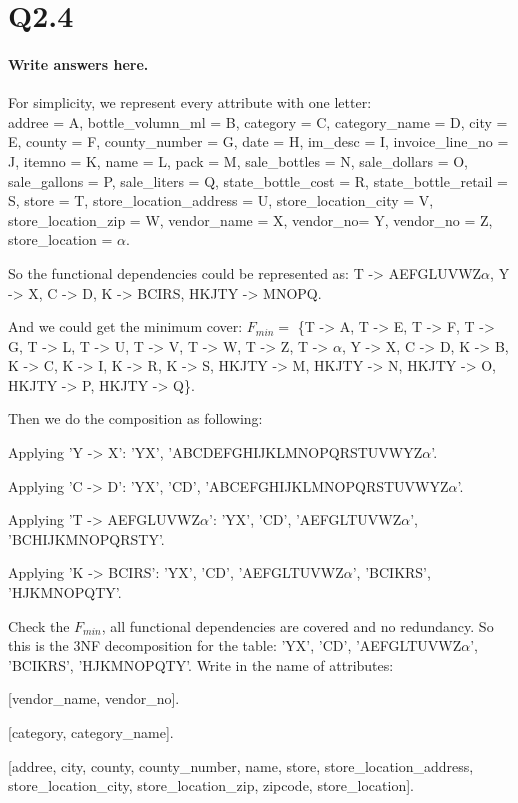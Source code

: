 \documentclass{article}
\begin{document}
\section*{Q2.4}
\paragraph{Write answers here.}

For simplicity, we represent every attribute with one letter:\\
addree = A, bottle\_volumn\_ml = B, category = C, category\_name = D, city = E, county = F, county\_number = G, date = H, im\_desc = I, invoice\_line\_no = J, itemno = K, name = L, pack = M, sale\_bottles = N, sale\_dollars = O, sale\_gallons = P, sale\_liters = Q, state\_bottle\_cost = R, state\_bottle\_retail = S, store = T, store\_location\_address = U, store\_location\_city = V, store\_location\_zip = W, vendor\_name = X, vendor\_no= Y, vendor\_no = Z, store\_location = $\alpha$.

So the functional dependencies could be represented as: T -> AEFGLUVWZ$\alpha$, Y -> X, C -> D, K -> BCIRS, HKJTY -> MNOPQ.

And we could get the minimum cover: $F_{min} = $ \{T -> A, T -> E, T -> F, T -> G, T -> L, T -> U, T -> V, T -> W, T -> Z, T -> $\alpha$, Y -> X, C -> D, K -> B, K -> C, K -> I, K -> R, K -> S, HKJTY -> M, HKJTY -> N, HKJTY -> O, HKJTY -> P, HKJTY -> Q\}.

Then we do the composition as following: 

Applying 'Y -> X': 'YX', 'ABCDEFGHIJKLMNOPQRSTUVWYZ$\alpha$'.

Applying 'C -> D': 'YX', 'CD', 'ABCEFGHIJKLMNOPQRSTUVWYZ$\alpha$'.

Applying 'T -> AEFGLUVWZ$\alpha$': 'YX', 'CD', 'AEFGLTUVWZ$\alpha$', 'BCHIJKMNOPQRSTY'.

Applying 'K -> BCIRS': 'YX', 'CD', 'AEFGLTUVWZ$\alpha$', 'BCIKRS', 'HJKMNOPQTY'.

Check the $F_{min}$, all functional dependencies are covered and no redundancy.
So this is the 3NF decomposition for the table: 'YX', 'CD', 'AEFGLTUVWZ$\alpha$', 'BCIKRS', 'HJKMNOPQTY'.
Write in the name of attributes:

[vendor\_name, vendor\_no].

[category, category\_name].

[addree, city, county, county\_number, name, store, store\_location\_address, store\_location\_city, store\_location\_zip, zipcode, store\_location].
\end{document}
